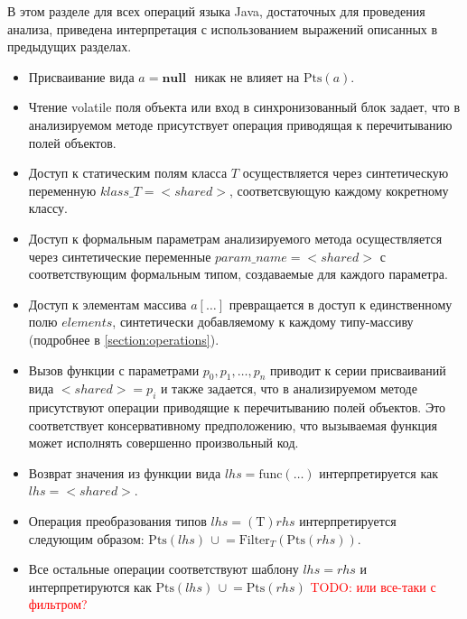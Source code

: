 \documentclass[14pt,titlepage]{extarticle}
\newcommand{\NULL}{\textbf{null }}
\newcommand{\Pts}[1]{\textrm{Pts}(#1)}
\newcommand{\Filter}[2]{\textrm{Filter}_{#1}(#2)}
\newcommand{\cupe}{\,\cup\!\!=}
\newcommand{\todo}[1]{\textcolor{red}{\eng{TODO}: #1}}
\newcommand{\eng}[1]{{\English#1}}
\begin{document}
        В этом разделе для всех операций языка Java, достаточных для
        проведения анализа, приведена интерпретация с использованием выражений
        описанных в предыдущих разделах.
        \begin{itemize}
          \item Присваивание вида $a = \NULL$ никак не влияет на $\Pts{a}$.
          \item Чтение \eng{volatile} поля объекта или вход в синхронизованный
                блок задает, что в анализируемом методе присутствует операция
                приводящая к перечитыванию полей объектов.
          \item Доступ к статическим полям класса $T$ осуществляется через
                синтетическую переменную $klass\_T = {<}shared{>}$,
                соответсвующую каждому кокретному классу.
          \item Доступ к формальным параметрам анализируемого метода
                осуществляется через синтетические переменные $param\_name =
                {<}shared{>}$ с соответствующим формальным типом, создаваемые
                для каждого параметра.
          \item Доступ к элементам массива $a[\ldots]$ превращается в доступ к
                единственному полю $elements$, синтетически добавляемому к
                каждому типу-массиву
                (подробнее в \ref{section:operations}).
          \item Вызов функции с параметрами $p_0, p_1, \ldots, p_n$ приводит к
                серии присваиваний вида ${<}shared{>} = p_i$ и
                также задается, что в анализируемом методе присутствуют
                операции приводящие к перечитыванию полей объектов. Это
                соответствует консервативному предположению, что вызываемая
                функция может исполнять совершенно произвольный код.
          \item Возврат значения из функции вида
                $lhs = \textrm{func}(\ldots)$ интерпретируется как
                $lhs = {<}shared{>}$.
          \item Операция преобразования типов $lhs = (\textrm{T})rhs$
                интерпретируется следующим образом:
                $\Pts{lhs} \cupe \Filter{T}{\Pts{rhs}}$.
          \item Все остальные операции соответствуют шаблону $lhs = rhs$ и
                интерпретируются как
                $\Pts{lhs} \cupe \Pts{rhs}$ \todo{или все-таки с фильтром?}
        \end{itemize}
\end{document}
